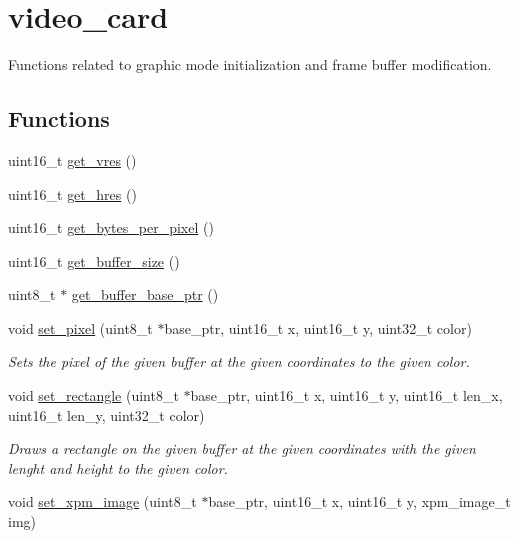 \hypertarget{group__video__card}{}\section{video\+\_\+card}
\label{group__video__card}


Functions related to graphic mode initialization and frame buffer modification.  


\subsection*{Functions}
\begin{DoxyCompactItemize}
\item 
uint16\+\_\+t \hyperlink{group__video__card_gad5999dee7ae30ea14b13e2e2e5a92c88}{get\+\_\+vres} ()
\item 
uint16\+\_\+t \hyperlink{group__video__card_ga8becb86f48f701c43e1c411f57f60c4d}{get\+\_\+hres} ()
\item 
uint16\+\_\+t \hyperlink{group__video__card_ga9f914dcc3574459a6f0f5fa903ad40e7}{get\+\_\+bytes\+\_\+per\+\_\+pixel} ()
\item 
uint16\+\_\+t \hyperlink{group__video__card_ga3ff6bb40b256e97af89a53bd459b59f5}{get\+\_\+buffer\+\_\+size} ()
\item 
uint8\+\_\+t $\ast$ \hyperlink{group__video__card_ga461fb4a3b5536b3de26e342444394ddd}{get\+\_\+buffer\+\_\+base\+\_\+ptr} ()
\item 
void \hyperlink{group__video__card_ga5f6f4feebf127c7d02258175e5df35ff}{set\+\_\+pixel} (uint8\+\_\+t $\ast$base\+\_\+ptr, uint16\+\_\+t x, uint16\+\_\+t y, uint32\+\_\+t color)
\begin{DoxyCompactList}\small\item\em Sets the pixel of the given buffer at the given coordinates to the given color. \end{DoxyCompactList}\item 
void \hyperlink{group__video__card_ga88795d0238c894e7d54c134b69305976}{set\+\_\+rectangle} (uint8\+\_\+t $\ast$base\+\_\+ptr, uint16\+\_\+t x, uint16\+\_\+t y, uint16\+\_\+t len\+\_\+x, uint16\+\_\+t len\+\_\+y, uint32\+\_\+t color)
\begin{DoxyCompactList}\small\item\em Draws a rectangle on the given buffer at the given coordinates with the given lenght and height to the given color. \end{DoxyCompactList}\item 
void \hyperlink{group__video__card_gacd25f5efb8e27da60488e6b317be5e12}{set\+\_\+xpm\+\_\+image} (uint8\+\_\+t $\ast$base\+\_\+ptr, uint16\+\_\+t x, uint16\+\_\+t y, xpm\+\_\+image\+\_\+t img)

\end{DoxyCompactItemize}
